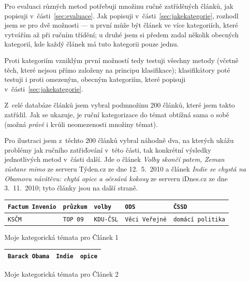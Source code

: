 \documentclass[12pt,a4paper]{report}
\begin{document}
Pro evaluaci různých metod potřebuji množinu ručně zatříděných článků, jak popisuji v~části~\ref{sec:evaluace}. Jak popisuji v~části~\ref{sec:jakekategorie}, rozhodl jsem se pro dvě možnosti --- u první může být článek ve více kategoriích, které vytvářím až při ručním třídění; u druhé jsem si předem zadal několik obecných kategorií, kde každý článek má tuto kategorii pouze jednu.

Proti kategoriím vzniklým první možností tedy testuji všechny metody (včetně těch, které nejsou přímo založeny na principu klasifikace); klasifikátory poté testuji i proti omezeným, obecným kategoriím, které popisuji v~části~\ref{sec:jakekategorie}.

Z~celé databáze článků jsem vybral podmnožinu 200 článků, které jsem takto zatřídil. Jak se ukazuje, je ruční kategorizace do témat obtížná sama o sobě (možná \emph{právě} i kvůli neomezenosti množiny témat). 

Pro ilustraci jsem z~těchto 200 článků vybral náhodně dva, na kterých ukážu problémy jak ručního zatřiďování v~této části, tak konkrétní výsledky jednotlivých metod v~části další. Jde o článek \emph{Volby skončí patem, Zeman zůstane mimo} ze serveru Týden.cz ze dne 12.~5.~2010 a článek \emph{Indie se chystá na Obamovu návštěvu: chytá opice a očesává kokosy} ze serveru iDnes.cz ze dne 3.~11.~2010; tyto články jsou na další straně.

 {


    \begin{tabular}{ |l |l |l |l |l | }
        \hline
        \texttt{Factum Invenio} &
        
        \texttt{průzkum} &
        \texttt{volby} &
        \texttt{ODS} &
        \texttt{ČSSD} \\ \hline
        \texttt{KSČM} &
        \texttt{TOP 09} &
        \texttt{KDU-ČSL} &
        \texttt{Věci Veřejné} &
        \texttt{domácí politika} \\ \hline
        
      \end{tabular}

}{Moje kategorická témata pro Článek 1}


  {

    \begin{tabular}{ |l  |l|l| }
        \hline
        \texttt{Barack Obama} &
        \texttt{Indie} &
        \texttt{opice} \\ \hline
      \end{tabular}


} {Moje kategorická témata pro Článek 2}
\end{document}
